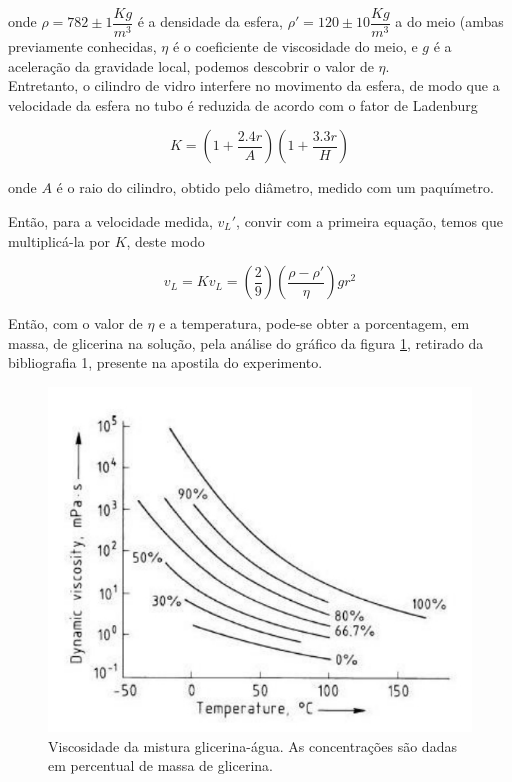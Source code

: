 \documentclass[12pt,a4paper]{article}
\begin{document}
onde $ \rho = 782 \pm 1  \dfrac{Kg}{m^3} $ é a densidade da esfera, $ \rho' = 120 \pm 10 \dfrac{Kg}{m^3} $ a do meio (ambas previamente conhecidas, $\eta$ é o coeficiente de viscosidade do meio, e $g$ é a aceleração da gravidade local, podemos descobrir o valor de $\eta$.\\

Entretanto, o cilindro de vidro interfere no movimento da esfera, de modo que a velocidade da esfera no tubo é reduzida de acordo com o fator de Ladenburg

$$K = (1 + \frac{2.4r}{A})(1 + \frac{3.3r}{H})$$

onde $A$ é o raio do cilindro, obtido pelo diâmetro, medido com um paquímetro.

Então, para a velocidade medida, $v_L'$, convir com a primeira equação, temos que multiplicá-la por $K$, deste modo

$$v_L = Kv_L = (\frac{2}{9}) (\frac{\rho - \rho'}{\eta}) g r^2$$

Então, com o valor de $\eta$ e a temperatura, pode-se obter a porcentagem, em massa, de glicerina na solução, pela análise do gráfico da figura \ref{porcentagem}, retirado da bibliografia 1, presente na apostila do experimento.\\

\begin{figure}[!htbp]
\centering
\includegraphics[scale=0.4]{Fig5-2.jpg}
\caption{Viscosidade da mistura glicerina-água. As concentrações
são dadas em percentual de massa de glicerina.}
\label{porcentagem}
\end{figure}
\end{document}
